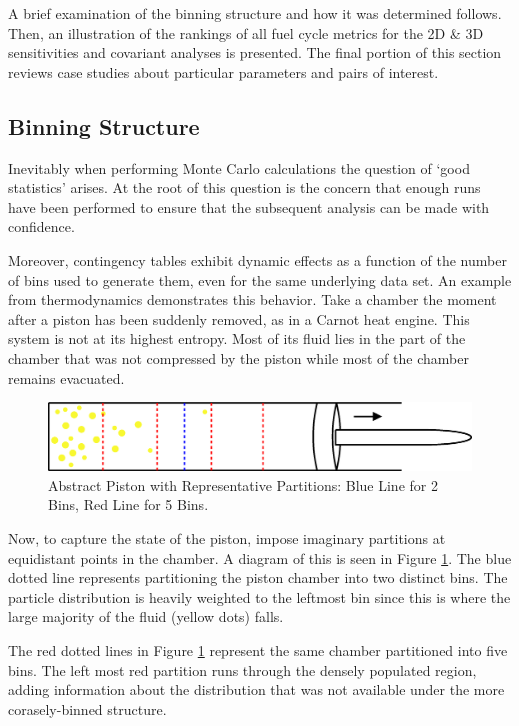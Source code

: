 \documentclass[preprint,12pt]{elsarticle}
\begin{document}
A brief examination of the binning structure and how it was determined follows. 
Then, an illustration of the rankings of all fuel cycle metrics for the 2D \& 3D sensitivities 
and covariant analyses is presented.  The final portion of this section reviews case studies 
about particular parameters and pairs of interest.


\subsection{Binning Structure}
\label{sec:binning}

Inevitably when performing Monte Carlo calculations the question of `good statistics' arises.  At the root of this question is the concern that enough runs
have been performed to ensure that the subsequent analysis can be made with confidence. 

Moreover, contingency tables exhibit dynamic effects as a function of the number of bins used to generate them, even for the same underlying data set.  An example from
thermodynamics demonstrates this behavior.  Take a chamber the moment after a piston has been suddenly removed, as in a Carnot heat engine.
This system is not at its highest entropy.  Most of its fluid lies in the part of the chamber that was not compressed by the piston while most of the
chamber remains evacuated.

\begin{figure}[htbp]
\begin{center}
\includegraphics[scale=0.50]{PistonCT.eps}
\caption{Abstract Piston with Representative Partitions: Blue Line for 2 Bins, Red Line for 5 Bins.}
\label{piston_ct}
\end{center}
\end{figure}

Now, to capture the state of the piston, impose imaginary partitions at equidistant points in the chamber.  A diagram of this is seen in Figure \ref{piston_ct}.  The blue
dotted line represents partitioning the piston chamber into two distinct bins.  The particle distribution is heavily weighted to the leftmost bin
since this is where the large majority of the fluid (yellow dots) falls.  

The red dotted lines in Figure \ref{piston_ct} represent the same chamber partitioned into five bins.  The left most red partition runs through the
densely populated region, adding information about the distribution that was not available under the more corasely-binned structure.
\end{document}

